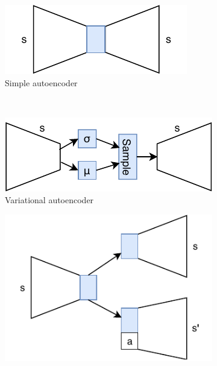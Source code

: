 \begin{figure}[t!]
	\centering
	\begin{subfigure}{0.45\columnwidth}
		\centering
		\includegraphics[width=\linewidth]{img/very_simple_autoencoder_v2.pdf}
		\caption{Simple autoencoder}
		\label{subfig:repr_learner_simple_autoencoder}
	\end{subfigure}%
	~ 
	\begin{subfigure}{0.45\columnwidth}
		\centering
		\includegraphics[width=\linewidth]{documentation/report/img/variational_autoencoder_v3.pdf}
		\caption{Variational autoencoder}
		\label{subfig:repr_learner_vae}
	\end{subfigure}
	\begin{subfigure}{0.5\columnwidth}
		\centering
		\includegraphics[width=\linewidth]{img/janus_v2.pdf}

\end{subfigure}
\end{figure}
